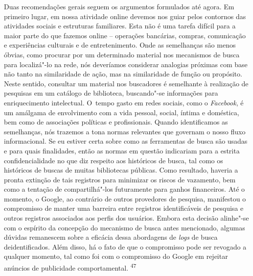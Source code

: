 Duas recomendações gerais seguem os argumentos formulados até agora. Em
primeiro lugar, em nossa atividade online devemos nos guiar pelos
contornos das atividades sociais e estruturas familiares. Esta não é uma
tarefa difícil para a maior parte do que fazemos online -- operações
bancárias, compras, comunicação e experiências culturais e de
entretenimento. Onde as semelhanças são menos óbvias, como procurar por
um determinado material nos mecanismos de busca para localizá"-lo na
rede, nós deveríamos considerar analogias próximas com base não tanto na
similaridade de ação, mas na similaridade de função ou propósito. Neste
sentido, consultar um material nos buscadores é semelhante à realização
de pesquisas em um catálogo de biblioteca, buscando"-se informações para
enriquecimento intelectual. O~tempo gasto em redes sociais, como o
\emph{Facebook}, é um amálgama de envolvimento com a vida pessoal,
social, íntima e doméstica, bem como de associações políticas e
profissionais. Quando identificamos as semelhanças, nós trazemos a tona
normas relevantes que governam o nosso fluxo informacional. Se eu
estiver certa sobre como as ferramentas de busca são usadas e para quais
finalidades, então as normas em questão indicariam para a estrita
confidencialidade no que diz respeito aos históricos de busca, tal como
os históricos de buscas de muitas bibliotecas públicas. Como resultado,
haveria a pronta extinção de tais registros para minimizar os riscos de
vazamento, bem como a tentação de compartilhá"-los futuramente para
ganhos financeiros. Até o momento, o Google, ao contrário de outros
provedores de pesquisa, manifestou o compromisso de manter uma barreira
entre registros identificáveis de pesquisa e outros registros associados
aos perfis dos usuários. Embora esta decisão alinhe"-se com o espírito da
concepção do mecanismo de busca antes mencionado, algumas dúvidas
remanescem sobre a eficácia dessa abordagens de \emph{logs} de busca
deidentificados. Além disso, há o fato de que o compromisso pode ser
revogado a qualquer momento, tal como foi com o compromisso do Google em
rejeitar anúncios de publicidade comportamental. \textsuperscript{{47}}

